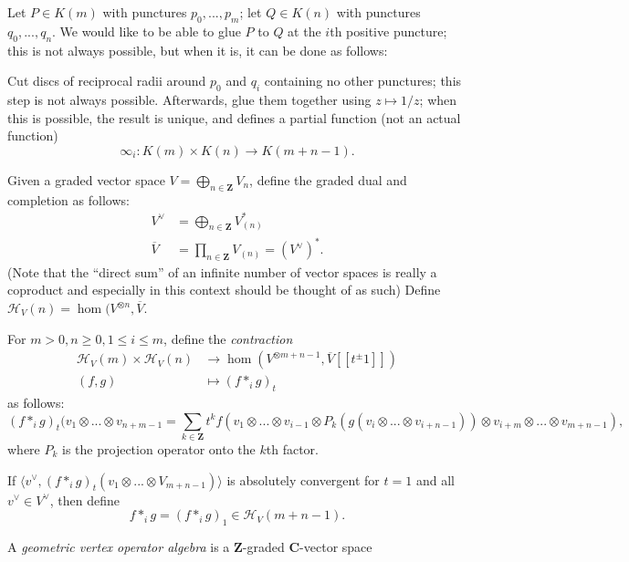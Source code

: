 \documentclass{article}
\newcommand{\CC}{\mathbold{C}}
\newcommand{\ZZ}{\mathbold{Z}}
\newcommand{\Hh}{\mathcal{H}}
\begin{document}
Let $P \in K(m)$ with punctures $p_0,...,p_m$; let $Q \in K(n)$ with punctures $q_0,...,q_n$.  We would like to be able to glue $P$ to $Q$ at the $i$th positive puncture; this is not always possible, but when it is, it can be done as follows:

Cut discs of reciprocal radii around $p_0$ and $q_i$ containing no other punctures; this step is not always possible.  Afterwards, glue them together using $z \mapsto 1/z$; when this is possible, the result is unique, and defines a partial function (not an actual function)
\[\infty_i : K(m) \times K(n) \rightarrow K(m+n-1). \]

Given a graded vector space $V=\bigoplus_{n \in \ZZ}V_n$, define the graded dual and completion as follows:
\begin{align}
  V^\vee&=\bigoplus_{n \in \ZZ}V^*_{(n)}\\
  \overline{V}&=\prod_{n \in \ZZ}V_{(n)}=(V^\vee)^*.
\end{align}
(Note that the ``direct sum'' of an infinite number of vector spaces is really a coproduct and especially in this context should be thought of as such)
Define $\Hh_V(n)=\hom(V^{\otimes n},\overline{V}$.

For $m>0, n \ge 0, 1 \le i \le m$, define the \textit{contraction}
\begin{align}
  \Hh_V(m) \times \Hh_V(n) &\rightarrow \hom(V^{\otimes m+n-1},\overline{V}[[t^\pm 1]])\\
  (f,g) &\mapsto (f *_i g)_t
\end{align}
as follows:
\[(f*_ig)_t(v_1 \otimes ... \otimes v_{n+m-1} = \sum_{k \in \ZZ}t^kf(v_1 \otimes ... \otimes v_{i-1} \otimes P_k(g(v_i \otimes ... \otimes v_{i+n-1})) \otimes v_{i+m} \otimes ... \otimes v_{m+n-1}), \]
where $P_k$ is the projection operator onto the $k$th factor.

If $\langle v^\vee,(f*_ig)_t(v_1 \otimes ... \otimes V_{m+n-1})\rangle$ is absolutely convergent for $t=1$ and all $v^\vee \in V^\vee$, then define
\[f*_ig=(f*_ig)_1 \in \Hh_V(m+n-1). \]

A \textit{geometric vertex operator algebra} is a $\ZZ$-graded $\CC$-vector space
\end{document}
